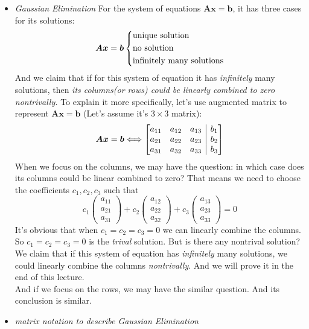 \begin{itemize}
\item
\emph{Gaussian Elimination}
For the system of equations $\bm A\bm x = \bm b$, it has three cases for its solutions:
\[
\bm A\bm x = \bm b\left\{
\begin{lgathered}
\text{unique solution}\\
\text{no solution}\\
\text{infinitely many solutions}
\end{lgathered}
\right.
\]
And we claim that if for this system of equation it has \emph{infinitely} many solutions, then \textit{its columns(or rows) could be linearly combined to zero nontrivally.} To explain it more specifically, let's use augmented matrix to represent $\bm A\bm x = \bm b$ (Let's assume it's $3\times 3$ matrix):
\[
\bm A\bm x = \bm b\Longleftrightarrow 
\left[
\begin{array}{@{}ccc|c@{}}
a_{11}&a_{12}&a_{13}&b_1\\
a_{21}&a_{22}&a_{23}&b_2\\
a_{31}&a_{32}&a_{33}&b_3
\end{array}
\right]
\]
When we focus on the columns, we may have the question: in which case does its columns could be linear combined to zero? That means we need to choose the coefficients $c_1,c_2,c_3$ such that 
\[
c_1\begin{pmatrix}
a_{11}\\a_{21}\\a_{31}
\end{pmatrix}+c_2\begin{pmatrix}
a_{12}\\a_{22}\\a_{32}
\end{pmatrix}+c_3\begin{pmatrix}
a_{13}\\a_{23}\\a_{33}
\end{pmatrix} = 0
\]
It's obvious that when $c_1=c_2=c_3=0$ we can linearly combine the columns. So $c_1=c_2=c_3=0$ is the \textit{trival} solution. But is there any nontrival solution? We claim that if this system of equation has \textit{infinitely} many solutions, we could linearly combine the columns \textit{nontrivally}. And we will prove it in the end of this lecture.\\
And if we focus on the rows, we may have the similar question. And its conclusion is similar.
\item
\emph{matrix notation to describe Gaussian Elimination}

\end{itemize}
